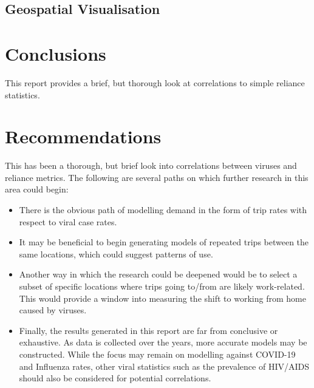 \documentclass[11pt]{article}
\begin{document}



\subsection{Geospatial Visualisation}

\section{Conclusions}

This report provides a brief, but thorough look at correlations to simple reliance statistics.


\section{Recommendations}
This has been a thorough, but brief look into correlations between viruses and reliance metrics.
The following are several paths on which further research in this area could begin:
\begin{itemize}
    \item There is the obvious path of modelling demand in the form of trip rates with respect to viral case rates. 
    \item It may be beneficial to begin generating models of repeated trips between the same locations,
    which could suggest patterns of use.
    \item Another way in which the research could be deepened would be to select a subset of specific locations where trips going to/from are likely work-related. 
    This would provide a window into measuring the shift to working from home caused by viruses.
    \item Finally, the results generated in this report are far from conclusive or exhaustive.
    As data is collected over the years, more accurate models may be constructed. 
    While the focus may remain on modelling against COVID-19 and Influenza rates, 
    other viral statistics such as the prevalence of HIV/AIDS should also be considered for potential correlations.
\end{itemize}

\clearpage

\printbibliography
\end{document}
